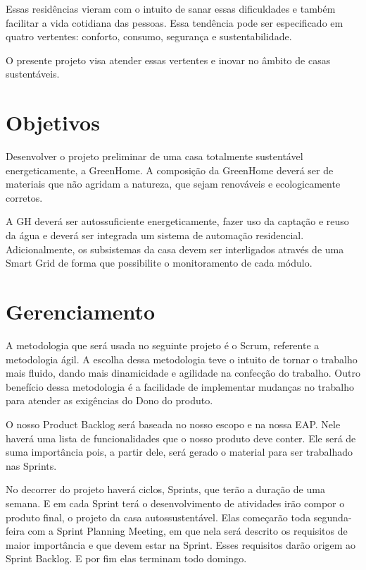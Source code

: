 	Essas residências vieram com o intuito de sanar essas dificuldades e também facilitar a vida cotidiana das pessoas. Essa tendência pode ser especificado em quatro vertentes: conforto, consumo, segurança e sustentabilidade.

	O presente projeto visa atender essas vertentes e inovar no âmbito de casas sustentáveis.


\section{Objetivos}

	Desenvolver o projeto preliminar de uma casa totalmente sustentável energeticamente, a GreenHome. A composição da GreenHome deverá ser de materiais que não agridam a natureza, que sejam renováveis e ecologicamente corretos.

	A GH deverá ser autossuficiente energeticamente, fazer uso da captação e reuso da água e deverá ser integrada um sistema de automação residencial. Adicionalmente, os subsistemas da casa devem ser interligados através de uma Smart Grid de forma que possibilite o monitoramento de cada módulo.

\section{Gerenciamento}

	A metodologia que será usada no seguinte projeto é o Scrum, referente a metodologia ágil. A escolha dessa metodologia teve o intuito de tornar o trabalho mais fluido, dando mais dinamicidade e agilidade na confecção do trabalho. Outro benefício dessa metodologia é a facilidade de implementar mudanças no trabalho para atender as exigências do Dono do produto.

	O nosso Product Backlog será baseada no nosso escopo e na nossa EAP. Nele haverá uma lista de funcionalidades que o nosso produto deve conter. Ele será de suma importância pois, a partir dele, será gerado o material para ser trabalhado nas Sprints.

	No decorrer do projeto haverá ciclos, Sprints, que terão a duração de uma semana. E em cada Sprint terá o desenvolvimento de atividades irão compor o produto final, o projeto da casa autossustentável. Elas começarão toda segunda-feira com a Sprint Planning Meeting, em que nela será descrito os requisitos de maior importância e que devem estar na Sprint. Esses requisitos darão origem ao Sprint Backlog. E por fim elas terminam todo domingo.

